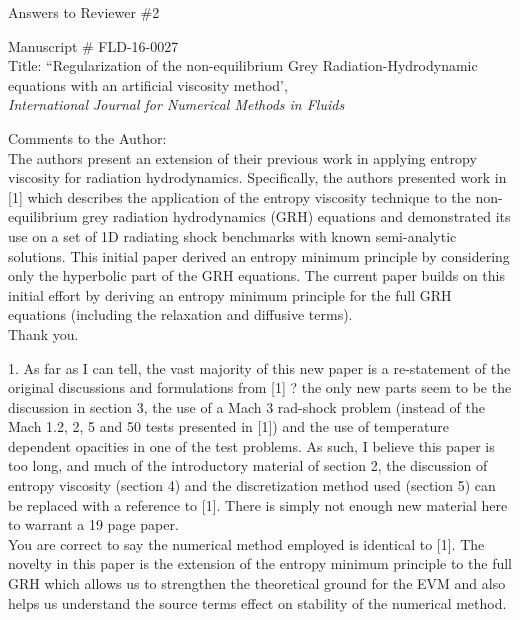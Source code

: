 \documentclass{article}
\begin{document}
\begin{center}
{ \Large Answers to Reviewer \#2}
\end{center}

\bigskip

\noindent Manuscript \# FLD-16-0027 \\
Title: ``Regularization of the non-equilibrium Grey Radiation-Hydrodynamic equations with an artificial viscosity method', \\
{\it International Journal for Numerical Methods in Fluids}\\

\bigskip
\bigskip

{\color{blue}
Comments to the Author: \\ 
The authors present an extension of their previous work in applying entropy viscosity for radiation hydrodynamics. Specifically, the authors presented work in [1] which describes the application of the entropy viscosity technique to the non-equilibrium grey radiation hydrodynamics (GRH) equations and demonstrated its use on a set of 1D radiating shock benchmarks with known semi-analytic solutions. This initial paper derived an entropy minimum principle by considering only the hyperbolic part of the GRH equations. The current paper builds on this initial effort by deriving an entropy minimum principle for the full GRH equations (including the relaxation and diffusive terms).\\}
Thank you.
\bigskip

{\color{blue}
1. As far as I can tell, the vast majority of this new paper is a re-statement of the original discussions and formulations from [1] ? the only new parts seem to be the discussion in section 3, the use of a Mach 3 rad-shock problem (instead of the Mach 1.2, 2, 5 and 50 tests presented in [1]) and the use of temperature dependent opacities in one of the test problems. As such, I believe this paper is too long, and much of the introductory material of section 2, the discussion of entropy viscosity (section 4) and the discretization method used (section 5) can be replaced with a reference to [1]. There is simply not enough new material here to warrant a 19 page paper. \\}
You are correct to say the numerical method employed is identical to [1]. The novelty in this paper is the extension of the entropy minimum principle to the full GRH which allows us to strengthen the  theoretical ground for the EVM and also helps us understand the source terms effect on stability of the numerical method. 
\end{document}
